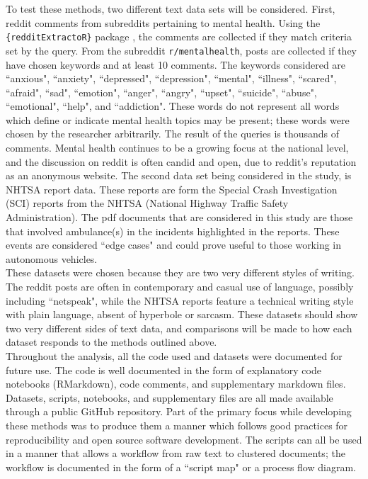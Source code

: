 To test these methods, two different text data sets will be considered. First, reddit comments from subreddits pertaining to mental health. Using the \texttt{\{redditExtractoR\}} package \cite{rivera2015package}, the comments are collected if they match criteria set by the query. From the subreddit \texttt{r/mentalhealth}, posts are collected if they have chosen keywords and at least 10 comments. The keywords considered are ``anxious", ``anxiety", ``depressed", ``depression", ``mental", ``illness", ``scared", ``afraid", ``sad", ``emotion", ``anger", ``angry", ``upset", ``suicide", ``abuse", ``emotional", ``help", and ``addiction". These words do not represent all words which define or indicate mental health topics may be present; these words were chosen by the researcher arbitrarily. The result of the queries is thousands of comments. Mental health continues to be a growing focus at the national level, and the discussion on reddit is often candid and open, due to reddit's reputation as an anonymous website. The second data set being considered in the study, is NHTSA report data. These reports are form the Special Crash Investigation (SCI) reports from the NHTSA (National Highway Traffic Safety Administration). The pdf documents that are considered in this study are those that involved ambulance(s) in the incidents highlighted in the reports. These events are considered ``edge cases" and could prove useful to those working in autonomous vehicles. \\
These datasets were chosen because they are two very different styles of writing. The reddit posts are often in contemporary and casual use of language, possibly including ``netspeak", while the NHTSA reports feature a technical writing style with plain language, absent of hyperbole or sarcasm. These datasets should show two very different sides of text data, and comparisons will be made to how each dataset responds to the methods outlined above. \\
Throughout the analysis, all the code used and datasets were documented for future use. The code is well documented in the form of explanatory code notebooks (RMarkdown), code comments, and supplementary markdown files. Datasets, scripts, notebooks, and supplementary files are all made available through a public GitHub repository. Part of the primary focus while developing these methods was to produce them a manner which follows good practices for reproducibility and open source software development. The scripts can all be used in a manner that allows a workflow from raw text to clustered documents; the workflow is documented in the form of a ``script map" or a process flow diagram. 